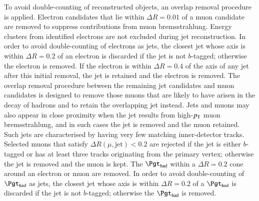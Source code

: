 To avoid double-counting of reconstructed objects, an overlap removal procedure is applied.
Electron candidates that lie 
within $\Delta R = 0.01$ of a muon candidate are removed to suppress contributions from muon bremsstrahlung. 
Energy clusters from identified electrons are not excluded during jet reconstruction. 
In order to avoid double-counting of electrons as jets, the closest jet whose axis is within ${\Delta}R = 0.2$ of an electron 
is discarded if the jet is not $b$-tagged; otherwise the electron is removed.
If the electron is within ${\Delta}R = 0.4$ of the axis of any jet after this initial removal, the jet is retained and  the electron is removed.
The overlap removal procedure between the remaining jet candidates and muon candidates is designed to remove those muons 
that are likely to have arisen in the decay of hadrons and to retain the overlapping jet instead. 
Jets and muons may also appear in close proximity when the jet results from high-$p_{\text{T}}$ muon bremsstrahlung, 
and in such cases the jet is removed and the muon retained. Such jets are characterised by having very 
few matching inner-detector tracks. Selected muons that satisfy $\Delta R(\mu,{\textrm{jet}}) < 0.2$ are rejected
if the jet is either $b$-tagged or has at least three tracks originating from the primary vertex; otherwise the jet is removed and the muon is kept.
The $\tauhad$ within a $\Delta R=0.2$ cone around an electron or muon are removed.
In order to avoid double-counting of $\tauhad$ as jets, the closest jet whose axis is
within ${\Delta}R = 0.2$ of a $\tauhad$ is discarded if the jet is not $b$-tagged; otherwise the $\tauhad$ is removed. 

